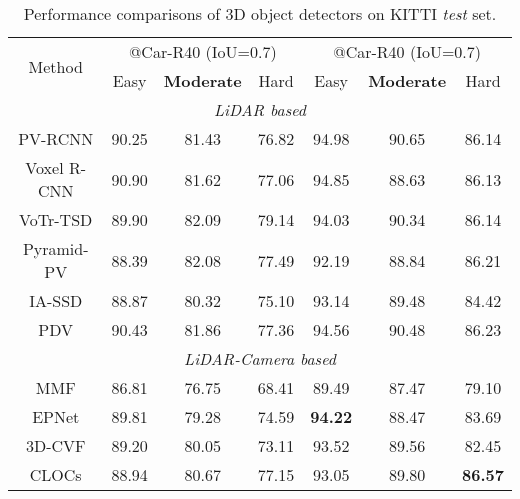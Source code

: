 \documentclass[lettersize,journal]{IEEEtran}
\begin{document}
 \begin{table*}[t]
\setlength{\tabcolsep}{11pt}
\renewcommand{\arraystretch}{1.0}
\centering
\caption{Performance comparisons of 3D object detectors on KITTI \textit{test} set.}
\begin{tabular}{ccccccc}

\cline{1-7}
\multirow{2}{*}{Method} &  \multicolumn{3}{c}{@Car-R40 (IoU=0.7)} & \multicolumn{3}{c}{@Car-R40 (IoU=0.7)} \\
\cline{2-4}
\cline{5-7}
                          & Easy     & \textbf{Moderate}    & Hard     & Easy      & \textbf{Moderate}    & Hard     \\
\cline{1-7}
\multicolumn{7}{c}{\textit{LiDAR based}}                                                                                \\
\cline{1-7}
PV-RCNN\cite{pvrcnn}           & 90.25    & 81.43                & 76.82    & 94.98     & 90.65                & 86.14    \\
Voxel R-CNN\cite{voxelrcnn}       & 90.90    & 81.62                & 77.06    & 94.85     & 88.63                & 86.13    \\
VoTr-TSD\cite{votr}      & 89.90    & 82.09                & 79.14    & 94.03     & 90.34                & 86.14    \\
Pyramid-PV\cite{pyramid}        & 88.39    & 82.08                & 77.49    & 92.19     & 88.84                & 86.21    \\
IA-SSD\cite{iassd}            & 88.87    & 80.32                & 75.10    & 93.14     & 89.48                & 84.42    \\
PDV\cite{pdv}           & 90.43    & 81.86                & 77.36    & 94.56     & 90.48                & 86.23    \\
\cline{1-7}
\multicolumn{7}{c}{\textit{LiDAR-Camera based}}                                                                                  \\
\cline{1-7}
MMF\cite{mmf}               & 86.81    & 76.75                & 68.41    & 89.49     & 87.47                & 79.10    \\
EPNet\cite{epnet}         & 89.81    & 79.28                & 74.59    & \textbf{94.22}     & 88.47                & 83.69    \\
3D-CVF\cite{3d-cvf}            & 89.20    & 80.05                & 73.11    & 93.52     & 89.56                & 82.45    \\
CLOCs\cite{clocs}             & 88.94    & 80.67                & 77.15    & 93.05     & 89.80                & \textbf{86.57}    \\

\end{tabular}
\end{table*}
\end{document}
